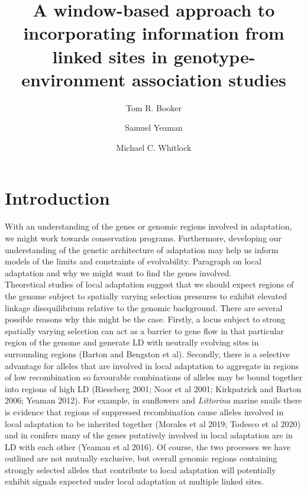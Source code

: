 \documentclass[11pt,twoside,lineno]{GSA_format}
\title{A window-based approach to incorporating information from linked sites in genotype-environment association studies}
\author[$\ast$]{Tom R. Booker}
\author[$\dagger$]{Samuel Yeaman}
\author[$\ast$]{Michael C. Whitlock}
\affil[$\ast$]{University of British Columbia}
\affil[$\dagger$]{University of Calgary}
\begin{document}
\maketitle
\marginmark
\firstpagefootnote


\vspace{-33pt}%

\section{Introduction}

With an understanding of the genes or genomic regions involved in adaptation, we might work towards conservation programs. Furthermore, developing our understanding of the genetic architecture of adaptation may help us inform models of the limits and constraints of evolvability. 
Paragraph on local adaptation and why we might want to find the genes involved. \\

Theoretical studies of local adaptation suggest that we should expect regions of the genome subject to spatially varying selection pressures to exhibit elevated linkage disequilibrium relative to the genomic background. There are several possible reasons why this might be the case. Firstly, a locus subject to strong spatially varying selection can act as a barrier to gene flow in that particular region of the genome and generate LD with neutrally evolving sites in surrounding regions (Barton and Bengston et al). Secondly, there is a selective advantage for alleles that are involved in local adaptation to aggregate in regions of low recombination so favourable combinations of alleles may be bound together into regions of high LD (Rieseberg 2001; Noor et al 2001; Kirkpatrick and Barton 2006; Yeaman 2012). For example, in sunflowers and \textit{Littorina} marine snails there is evidence that regions of suppressed recombination cause alleles involved in local adaptation to be inherited together (Morales et al 2019; Todesco et al 2020) and in conifers many of the genes putatively involved in local adaptation are in LD with each other (Yeaman et al 2016). Of course, the two processes we have outlined are not mutually exclusive, but overall genomic regions containing strongly selected alleles that contribute to local adaptation will potentially exhibit signals expected under local adaptation at multiple linked sites. \\
\end{document}
